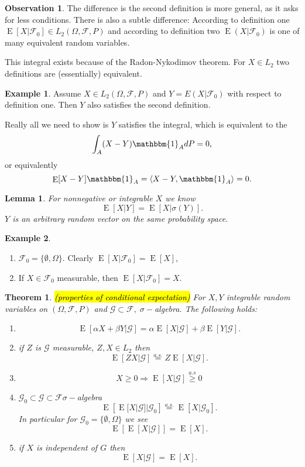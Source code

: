 \documentclass[12pt,a4paper, notitlepage]{book}
\newcommand{\hlc}[2][yellow]{ {\sethlcolor{#1} \hl{#2}} }
\theoremstyle{definition} %
\newtheorem{example}{Example}[chapter]
\newtheorem*{observation}{Observation}
\theoremstyle{plain} %
\newtheorem{definition}{Lemma}[chapter]
\newtheorem{theorem}{Theorem}
\newcommand{\Fc}{\mathcal{ F}}
\newcommand{\Gc}{\mathcal{ G}}
\DeclareMathOperator{\E}{E}
\newcommand{\Important}[1]{ {\it \hlc{#1} } }
\begin{document}
\begin{observation}
The difference is the second definition is more general, as it asks for less conditions. There is also a subtle difference:
According to definition one
$\E[X | \Fc_0] \in  L_2(\Omega, \Fc, P)$ and according to definition two 
$\E(X | \Fc_0)$ is one of many equivalent random variables. 

This integral exists because of the Radon-Nykodimov theorem. For $X \in L_2$ two definitions are (essentially) equivalent.
\end{observation}

\begin{example}
Assume $X \in  L_2(\Omega, \Fc, P)$ and $Y = E(X |\Fc_0)$ with respect to definition one. Then $Y$ also satisfies the second definition.

Really all we need to show  is $Y$ satisfies the integral, which is equivalent to the 
\[ \int_A(X-Y)\mathbbm{1}_A dP = 0, \]
or equivalently
\[ \E[X - Y] \mathbbm{1}_A =  \langle X-Y, \mathbbm{1}_A \rangle = 0  .\]
\end{example}

\begin{definition}
For nonnegative or integrable $X$ we know
\[ \E[X | Y ] = \E[X | \sigma(Y)] . \]
$Y$ is an arbitrary random vector on the same probability space. 
\end{definition}


\begin{example}
\begin{enumerate}
\item $\Fc_0 = \{\emptyset, \Omega\}$. Clearly $\E[X | \Fc_0] = \E[X]$,
\item If $X \in \Fc_0$ measurable, then $\E[X | \Fc_0] = X$.
\end{enumerate}
\end{example}

\begin{theorem} \Important{(properties of conditional expectation)}
For $X,Y$ integrable random variables on $(\Omega, \Fc, P)$ and $\Gc \subset \Fc  , \;\sigma-$algebra. The following holds:
\begin{enumerate}
\item \[ \E[\alpha X + \beta Y | \Gc] = \alpha \E[X | \Gc] + \beta \E[Y | \Gc] . \]
\item if $Z$ is $ \Gc $ measurable, $Z, X \in L_2$ then 
\[ \E[Z X|\Gc] \overset{a.s.}{ = } Z \E[X|\Gc]  . \]
\item \[ X \geq 0  \Rightarrow  \E[X | \Gc] \overset{a.s}{ \geq } 0 \]
\item  $ \Gc_0 \subset \Gc \subset \Fc \sigma-$algebra
\[ \E \left[ \E[X|\Gc] |\Gc_0\right] \overset{a.s.}{=} \E[X|\Gc_0] . \]
In particular for $\Gc_0 = \{\emptyset, \Omega\}$ we see
\[ \E\left[\E[X|\Gc]\right] = \E[X] . \]
\item if $X$ is independent of $G$ then
\[ \E[X | \Gc ] = \E[X] . \]
\end{enumerate}
\end{theorem}
\end{document}
